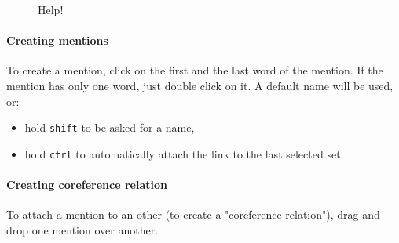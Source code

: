\documentclass[12pt]{article}
\begin{document}
\begin{figure}[tbp]
\begin{center}
\end{center}
\caption{Help!}
\label{fig:help}
\end{figure}

\paragraph{Creating mentions}  To create a mention, click on the first and
the last word of the mention.  If the mention has only one word, just
double click on it.  A default name will be used, or:
\begin{itemize}
   \item hold \verb|shift| to be asked for a name,
   \item hold \verb|ctrl| to automatically attach the link to the last
      selected set.
\end{itemize}

\paragraph{Creating coreference relation} To attach a mention to an other (to
create a "coreference relation"), drag-and-drop one mention over another.
\end{document}
